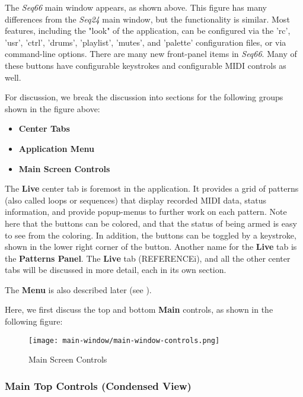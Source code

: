 \documentclass[
 11pt,
 twoside,
 a4paper,
 headinclude,
 footinclude,
 final                                 %
]{article}
\begin{document}
   The \textsl{Seq66} main window appears, as shown above.
   This figure has many differences from the \textsl{Seq24} main window,
   but the functionality is similar.
   Most features, including the "look" of the application,
   can be configured via the 'rc', 'usr', 'ctrl', 'drums', 'playlist', 'mutes',
   and 'palette' configuration files, or via command-line options.
   There are many new front-panel items in \textsl{Seq66}.
   Many of these buttons have configurable keystrokes and configurable MIDI
   controls as well.

   For discussion, we break the discussion into sections for the following
   groups shown in the figure above:

   \begin{itemize}
      \item \textbf{Center Tabs}
      \item \textbf{Application Menu}
      \item \textbf{Main Screen Controls}
   \end{itemize}

   The \textbf{Live} center tab is foremost in the application.
   It provides a grid of patterns (also called loops or
   sequences) that display recorded MIDI data, status information, and provide
   popup-menus to further work on each pattern.  Note here that the buttons can
   be colored, and that the status of being armed is easy to see from the
   coloring.
   In addition, the buttons can be toggled by a keystroke, shown in the lower
   right corner of the button.
   Another name for the \textbf{Live} tab is the \textbf{Patterns Panel}.
   The \textbf{Live} tab (REFERENCEi), and all the other center tabs
   will be discussed in more detail, each in its own section.

   The \textbf{Menu} is also described later (see ).

   Here, we first discuss the top and bottom \textbf{Main} controls, as
   shown in the following figure:

\begin{figure}[H]
   \centering 
   \texttt{[image: main-window/main-window-controls.png]}
   \caption{Main Screen Controls}
   \label{fig:main_screen_controls}
\end{figure}

\subsubsection{Main Top Controls (Condensed View)}
\label{subsubsec:introduction_main_top_controls}
\end{document}
